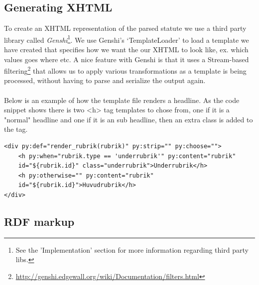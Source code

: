 \subsection{Generating XHTML}
To create an XHTML representation of the parsed statute we use a third party library called \textit{Genshi}\footnote{See the 'Implementation' section for more information regarding third party libs.}. We use Genshi’s ‘TemplateLoader’ to load a template we have created that specifies how we want the our XHTML to look like, ex. which values goes where etc. A nice feature with Genshi is that it uses a Stream-based filtering\footnote{\url{http://genshi.edgewall.org/wiki/Documentation/filters.html}} that allows us to apply various transformations as a template is being processed, without having to parse and serialize the output again.\\\\
Below is an example of how the template file renders a headline. As the code
snippet shows there is two <h> tag templates to chose from, one if it is a "normal" headline and one if it is an sub headline, then an extra class is added to the tag.\\
\begin{verbatim}
<div py:def="render_rubrik(rubrik)" py:strip="" py:choose="">
    <h py:when="rubrik.type == 'underrubrik'" py:content="rubrik"
	id="${rubrik.id}" class="underrubrik">Underrubrik</h>
    <h py:otherwise="" py:content="rubrik"
	id="${rubrik.id}">Huvudrubrik</h>
</div>
\end{verbatim}
\linebreak  
\newline


\subsection{RDF markup }

